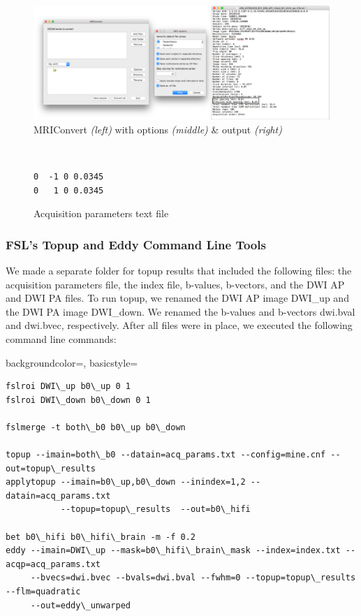 \begin{figure}[H]
    \centering
    \includegraphics[width=\textwidth]{Figures/combined}
    \caption{MRIConvert \textit{(left)} with options \textit{(middle)} \& output \textit{(right)} }
    \label{fig:mri_convert}
\end{figure}

\begin{figure}[H]
\centering
{\tt
\begin{varwidth}{\linewidth}
\begin{verbatim}
0  -1 0 0.0345
0   1 0 0.0345
\end{verbatim}
\end{varwidth}
}
\label{fig:acq}
\caption{Acquisition parameters text file}
\end{figure}

\subsubsection{FSL's Topup and Eddy Command Line Tools}

We made a separate folder for topup results that included the following files: the acquisition parameters file, the index file, b-values, b-vectors, and the DWI AP and DWI PA files. To run topup, we renamed the DWI AP image DWI\_up and the DWI PA image DWI\_down. We renamed the b-values and b-vectors dwi.bval and dwi.bvec, respectively. After all files were in place, we executed the following command line commands:

{
    backgroundcolor=\color{white},
    basicstyle=\scriptsize\color{black}\ttfamily
}

\begin{lstlisting}[style=DOS]
fslroi DWI\_up b0\_up 0 1
fslroi DWI\_down b0\_down 0 1

fslmerge -t both\_b0 b0\_up b0\_down

topup --imain=both\_b0 --datain=acq_params.txt --config=mine.cnf --out=topup\_results
applytopup --imain=b0\_up,b0\_down --inindex=1,2 --datain=acq_params.txt
           --topup=topup\_results  --out=b0\_hifi

bet b0\_hifi b0\_hifi\_brain -m -f 0.2
eddy --imain=DWI\_up --mask=b0\_hifi\_brain\_mask --index=index.txt --acqp=acq_params.txt
     --bvecs=dwi.bvec --bvals=dwi.bval --fwhm=0 --topup=topup\_results --flm=quadratic
     --out=eddy\_unwarped

\end{lstlisting}

